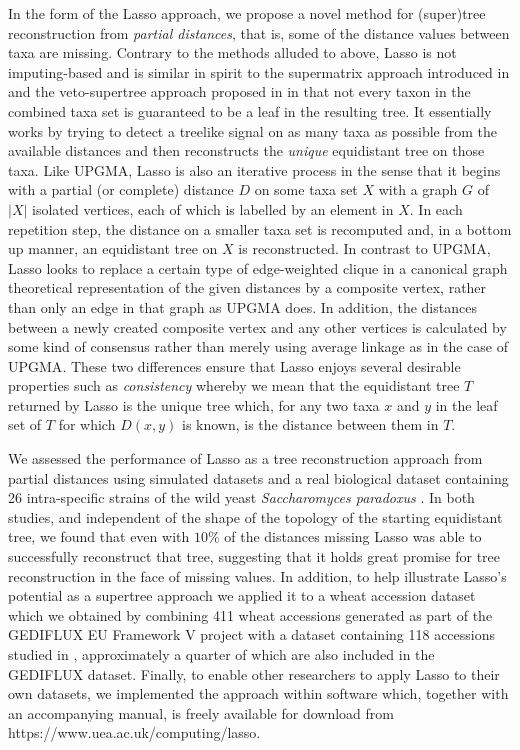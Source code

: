 In the form of the {\sc Lasso} approach, we propose a novel method for
(super)tree reconstruction from {\em partial distances}, that is, some of the
distance values between taxa are missing. Contrary to the methods alluded to
above, {\sc Lasso} is not imputing-based and is similar in spirit to the
supermatrix approach introduced in \cite{misof13selecting} and the
veto-supertree approach proposed in \cite{scorn08physic} in that not every
taxon in the combined taxa set is guaranteed to be a leaf in the resulting
tree. It essentially works by trying to detect a treelike signal on as many
taxa as possible from the available distances and then reconstructs the
\textit{unique} equidistant tree on those taxa.  Like {\sc UPGMA}, {\sc Lasso}
is also an iterative process in the sense that it begins with a partial (or
complete) distance $D$ on some taxa set $X$ with a graph $G$ of $|X|$ isolated
vertices, each of which is labelled by an element in $X$. In each repetition
step, the distance on a smaller taxa set is recomputed and, in a bottom up
manner, an equidistant tree on $X$ is reconstructed. In contrast to {\sc
  UPGMA}, {\sc Lasso} looks to replace a certain type of edge-weighted clique
in a canonical graph theoretical representation of the given distances by a
composite vertex, rather than only an edge in that graph as {\sc UPGMA}
does. In addition, the distances between a newly created composite vertex and
any other vertices is calculated by some kind of consensus rather than merely
using average linkage as in the case of {\sc UPGMA}.  These two differences
ensure that {\sc Lasso} enjoys several desirable properties such as {\em
  consistency} whereby we mean that the equidistant tree $T$ returned by {\sc
  Lasso} is the unique tree which, for any two taxa $x$ and $y$ in the leaf
set of $T$ for which $D(x,y)$ is known, is the distance between them in $T$.

We assessed the performance of {\sc Lasso} as a tree reconstruction approach
from partial distances using simulated datasets and a real biological dataset
containing 26 intra-specific strains of the wild yeast \textit{Saccharomyces
  paradoxus} \cite{west14ribosomal}.  In both studies, and independent of the
shape of the topology of the starting equidistant tree, we found that even
with $10\%$ of the distances missing {\sc Lasso} was able to successfully
reconstruct that tree, suggesting that it holds great promise for tree
reconstruction in the face of missing values.  In addition, to help illustrate
{\sc Lasso}'s potential as a supertree approach we applied it to a wheat
accession dataset which we obtained by combining 411 wheat accessions
generated as part of the GEDIFLUX EU Framework V project \cite{gediflux} with
a dataset containing 118 accessions studied in \cite{muge}, approximately a
quarter of which are also included in the GEDIFLUX dataset. Finally, to enable
other researchers to apply {\sc Lasso} to their own datasets, we implemented
the approach within software which, together with an accompanying manual, is
freely available for download from https://www.uea.ac.uk/computing/lasso.

